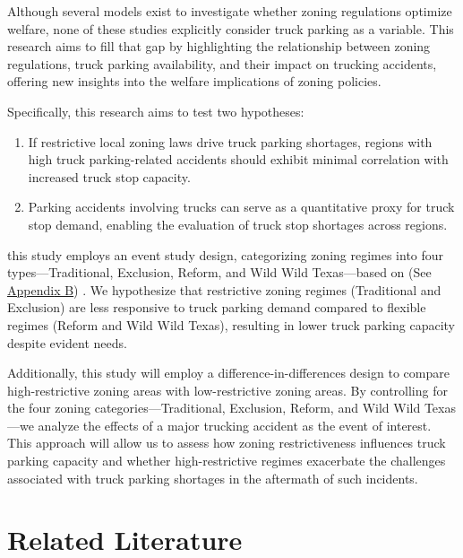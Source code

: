 \documentclass[
  12pt]{article}
\begin{document}
Although several models exist to investigate whether zoning regulations
optimize welfare, none of these studies explicitly consider truck
parking as a variable. This research aims to fill that gap by
highlighting the relationship between zoning regulations, truck parking
availability, and their impact on trucking accidents, offering new
insights into the welfare implications of zoning policies.

Specifically, this research aims to test two hypotheses:

\begin{enumerate}
\def\labelenumi{\arabic{enumi}.}
\item
  If restrictive local zoning laws drive truck parking shortages,
  regions with high truck parking-related accidents should exhibit
  minimal correlation with increased truck stop capacity.
\item
  Parking accidents involving trucks can serve as a quantitative proxy
  for truck stop demand, enabling the evaluation of truck stop shortages
  across regions.
\end{enumerate}

this study employs an event study design, categorizing zoning regimes
into four types---Traditional, Exclusion, Reform, and Wild Wild
Texas---based on \citep{puentesTraditionalReformedReview2006} (See
\label{sec:appendix-b}\hyperref[sec-b.-map-of-zoning-categories]{Appendi}\hyperref[sec:appendix-b]{x
B}) . We hypothesize that restrictive zoning regimes (Traditional and
Exclusion) are less responsive to truck parking demand compared to
flexible regimes (Reform and Wild Wild Texas), resulting in lower truck
parking capacity despite evident needs.

Additionally, this study will employ a difference-in-differences design
to compare high-restrictive zoning areas with low-restrictive zoning
areas. By controlling for the four zoning categories---Traditional,
Exclusion, Reform, and Wild Wild Texas---we analyze the effects of a
major trucking accident as the event of interest. This approach will
allow us to assess how zoning restrictiveness influences truck parking
capacity and whether high-restrictive regimes exacerbate the challenges
associated with truck parking shortages in the aftermath of such
incidents.

\section{Related Literature}\label{related-literature}
\end{document}
